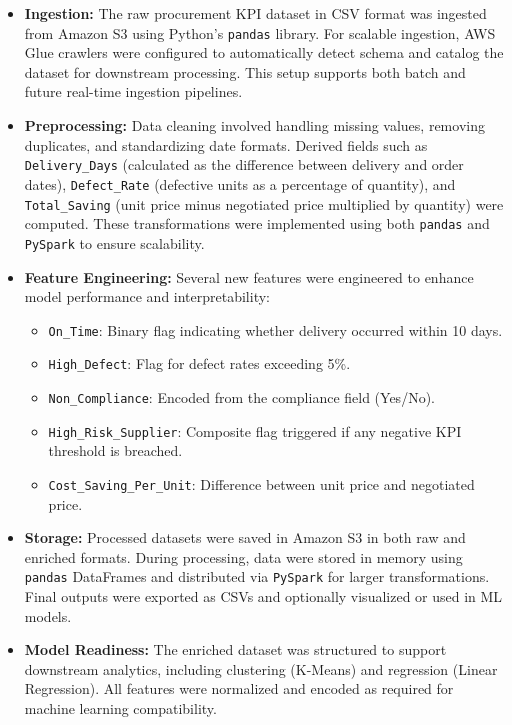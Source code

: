 \documentclass[10pt, twocolumn]{article}
\begin{document}
\begin{itemize}
    \item \textbf{Ingestion:} The raw procurement KPI dataset in CSV format was ingested from Amazon S3 using Python’s \texttt{pandas} library. For scalable ingestion, AWS Glue crawlers were configured to automatically detect schema and catalog the dataset for downstream processing. This setup supports both batch and future real-time ingestion pipelines.

    \item \textbf{Preprocessing:} Data cleaning involved handling missing values, removing duplicates, and standardizing date formats. Derived fields such as \texttt{Delivery\_Days} (calculated as the difference between delivery and order dates), \texttt{Defect\_Rate} (defective units as a percentage of quantity), and \texttt{Total\_Saving} (unit price minus negotiated price multiplied by quantity) were computed. These transformations were implemented using both \texttt{pandas} and \texttt{PySpark} to ensure scalability.

    \item \textbf{Feature Engineering:} Several new features were engineered to enhance model performance and interpretability:
    \begin{itemize}
        \item \texttt{On\_Time}: Binary flag indicating whether delivery occurred within 10 days.
        \item \texttt{High\_Defect}: Flag for defect rates exceeding 5\%.
        \item \texttt{Non\_Compliance}: Encoded from the compliance field (Yes/No).
        \item \texttt{High\_Risk\_Supplier}: Composite flag triggered if any negative KPI threshold is breached.
        \item \texttt{Cost\_Saving\_Per\_Unit}: Difference between unit price and negotiated price.
    \end{itemize}

    \item \textbf{Storage:} Processed datasets were saved in Amazon S3 in both raw and enriched formats. During processing, data were stored in memory using \texttt{pandas} DataFrames and distributed via \texttt{PySpark} for larger transformations. Final outputs were exported as CSVs and optionally visualized or used in ML models.

    \item \textbf{Model Readiness:} The enriched dataset was structured to support downstream analytics, including clustering (K-Means) and regression (Linear Regression). All features were normalized and encoded as required for machine learning compatibility.


\end{itemize}
\end{document}
